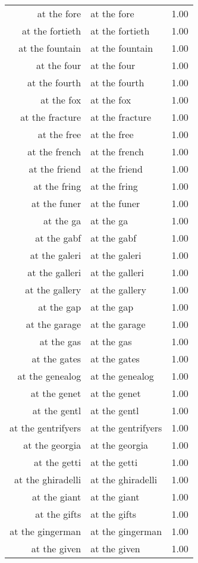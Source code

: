 \begin{table}[ht]
\begin{tabular}{rlr}
  at the fore & at the fore & 1.00 \\ 
  at the fortieth & at the fortieth & 1.00 \\ 
  at the fountain & at the fountain & 1.00 \\ 
  at the four & at the four & 1.00 \\ 
  at the fourth & at the fourth & 1.00 \\ 
  at the fox & at the fox & 1.00 \\ 
  at the fracture & at the fracture & 1.00 \\ 
  at the free & at the free & 1.00 \\ 
  at the french & at the french & 1.00 \\ 
  at the friend & at the friend & 1.00 \\ 
  at the fring & at the fring & 1.00 \\ 
  at the funer & at the funer & 1.00 \\ 
  at the ga & at the ga & 1.00 \\ 
  at the gabf & at the gabf & 1.00 \\ 
  at the galeri & at the galeri & 1.00 \\ 
  at the galleri & at the galleri & 1.00 \\ 
  at the gallery & at the gallery & 1.00 \\ 
  at the gap & at the gap & 1.00 \\ 
  at the garage & at the garage & 1.00 \\ 
  at the gas & at the gas & 1.00 \\ 
  at the gates & at the gates & 1.00 \\ 
  at the genealog & at the genealog & 1.00 \\ 
  at the genet & at the genet & 1.00 \\ 
  at the gentl & at the gentl & 1.00 \\ 
  at the gentrifyers & at the gentrifyers & 1.00 \\ 
  at the georgia & at the georgia & 1.00 \\ 
  at the getti & at the getti & 1.00 \\ 
  at the ghiradelli & at the ghiradelli & 1.00 \\ 
  at the giant & at the giant & 1.00 \\ 
  at the gifts & at the gifts & 1.00 \\ 
  at the gingerman & at the gingerman & 1.00 \\ 
  at the given & at the given & 1.00 \\ 

\end{tabular}
\end{table}
